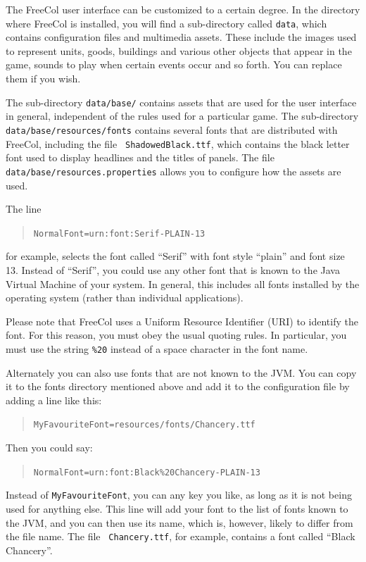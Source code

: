\documentclass[12pt]{book}
\begin{document}
The FreeCol user interface can be customized to a certain degree. In
the directory where FreeCol is installed, you will find a
sub-directory called {\tt data}, which contains configuration files
and multimedia assets. These include the images used to represent
units, goods, buildings and various other objects that appear in the
game, sounds to play when certain events occur and so forth. You can
replace them if you wish.

The sub-directory {\tt data/base/} contains assets that are used for
the user interface in general, independent of the rules used for a
particular game. The sub-directory {\tt
  data/\-base/\-resources/\-fonts} contains several fonts
that are distributed with FreeCol, including the file {\tt
  ShadowedBlack.ttf}, which contains the black letter font used to
display headlines and the titles of panels. The file {\tt
  data/\-base/\-resources.properties} allows you to configure how the
assets are used.

The line

\begin{quote}
{\tt NormalFont=urn:font:Serif-PLAIN-13}
\end{quote}

for example, selects the font called ``Serif'' with font style
``plain'' and font size 13. Instead of ``Serif'', you could use any
other font that is known to the Java Virtual Machine of your
system. In general, this includes all fonts installed by the operating
system (rather than individual applications).

Please note that FreeCol uses a Uniform Resource Identifier (URI) to
identify the font. For this reason, you must obey the usual quoting
rules. In particular, you must use the string {\tt \%20} instead of a
space character in the font name.

Alternately you can also use fonts that are not known to the JVM. You
can copy it to the fonts directory mentioned above and add it to the
configuration file by adding a line like this:

\begin{quote}
{\tt MyFavouriteFont=resources/fonts/Chancery.ttf}
\end{quote}

Then you could say:

\begin{quote}
{\tt NormalFont=urn:font:Black\%20Chancery-PLAIN-13}
\end{quote}

Instead of {\tt MyFavouriteFont}, you can any key you like, as long as
it is not being used for anything else. This line will add your font
to the list of fonts known to the JVM, and you can then use its name,
which is, however, likely to differ from the file name. The file {\tt
  Chancery.ttf}, for example, contains a font called ``Black
Chancery''.
\end{document}
